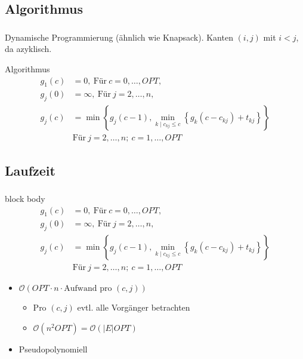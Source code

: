 \documentclass{beamer}
\begin{document}
\subsection{Algorithmus}
\begin{frame}
   \frametitle{\insertsection}
   \framesubtitle{\insertsubsection}

   Dynamische Programmierung (ähnlich wie Knapsack). Kanten $(i,j)$ mit $i < j$,
   da azyklisch.
   \begin{block}{Algorithmus}
      \begin{align*}
         g_1(c) & =  0, ~ \text{Für} ~ c = 0,\ldots,OPT, \\
         g_j(0) & =  \infty, ~ \text{Für} ~ j = 2,\ldots,n, \\
         g_j(c) & =  \min\left\{g_j(c-1), \min_{k \mid c_{kj} \le
   c}\left\{g_k(c-c_{kj}) + t_{kj}\right\}\right\} \\
   & \text{Für} ~ j = 2,\ldots,n; ~ c= 1,\ldots,OPT
\end{align*}
   \end{block}
\end{frame}

\subsection{Laufzeit}

\begin{frame}
   \frametitle{\insertsection}
   \framesubtitle{\insertsubsection}
   \begin{beamercolorbox}[center,wd=\paperwidth]{block body}
      \begin{align*}
         g_1(c) & =  0, ~ \text{Für} ~ c = 0,\ldots,OPT, \\
         g_j(0) & =  \infty, ~ \text{Für} ~ j = 2,\ldots,n, \\
         g_j(c) & =  \min\left\{g_j(c-1), \min_{k \mid c_{kj} \le c}\left\{g_k(c-c_{kj}) + t_{kj}\right\}\right\} \\
                & \text{Für} ~ j = 2,\ldots,n; ~ c= 1,\ldots,OPT
      \end{align*}
   \end{beamercolorbox}

   \begin{itemize}
      \item $\mathcal{O}(OPT\cdot n \cdot \text{Aufwand pro $(c,j)$})$
         \begin{itemize}
            \item Pro $(c,j)$ evtl. alle Vorgänger betrachten
            \item $\mathcal{O}\left(n^2 OPT\right) = \mathcal{O}\left(|E| OPT\right)$
         \end{itemize}
      \item Pseudopolynomiell
   \end{itemize}

\end{frame}
\end{document}
